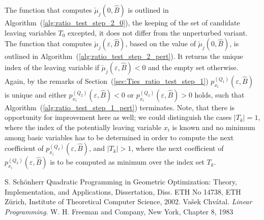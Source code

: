 \documentclass[a4paper]{article}
\newcommand{\px}[3]{\ensuremath{p_{x_{#1}}^{(#2)}(\varepsilon, #3)}}
\begin{document}
The function that computes $\check{\mu}_{j}(0, \hat{B})$ is outlined in
Algorithm~(\ref{alg:ratio_test_step_2_0}), the keeping of the set of
candidate leaving variables $T_{0}$ excepted, it does not differ from the
unperturbed variant. 
The function that computes $\check{\mu}_{j}(\varepsilon, \hat{B})$, based on
the value of $\check{\mu}_{j}(0, \hat{B})$, is outlined
in Algorithm~(\ref{alg:ratio_test_step_2_pert}). It returns the unique index of
the leaving variable if $\check{\mu}_{j}(\varepsilon, \hat{B})<0$ and the empty
set otherwise.
Again, by the remarks of
Section~(\ref{sec:Ties_ratio_test_step_1}) \px{i}{Q_{1}}{\hat{B}} is unique and
either $\px{i}{Q_{2}}{\hat{B}} < 0$ or $\px{i}{Q_{2}}{\hat{B}} > 0$
holds, such that Algorithm~(\ref{alg:ratio_test_step_1_pert}) terminates.
Note, that there is opportunity for improvement here as well;
we could distinguish the cases $\left|T_{k}\right|=1$, where the index of
the potentially leaving variable $x_{i}$ is known and no minimum among basic
variables has to be determined in order to compute the next coefficient of
\px{i}{Q_{2}}{\hat{B}}, and
$\left|T_{k}\right|>1$, where the next coefficient of
\px{i}{Q_{2}}{\hat{B}} is to be computed as minimum over the index set $T_{k}$.

\begin{thebibliography}{99}
 S. Sch\"{o}nherr Quadratic Programming in Geometric Optimization:
Theory, Implementation, and Applications, Dissertation, Diss. ETH No 14738, ETH
Z\"{u}rich, Institute of Theoretical Computer Science, 2002.
 Va\v{s}ek Chv\'{a}tal. \textit{Linear Programming}. W. H. Freeman and Company,
New York, Chapter 8, 1983 
\end{thebibliography}
\end{document}

